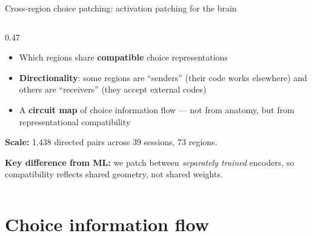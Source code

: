 \documentclass[aspectratio=169,11pt]{beamer}
\begin{document}
\begin{frame}{Cross-region choice patching: activation patching for the brain}
\begin{columns}[T]
\begin{column}{0.47\textwidth}
\vspace{0.5em}
{\small
\begin{itemize}\setlength\itemsep{0.5em}
  \item Which regions share \textbf{compatible} choice representations
  \item \textbf{Directionality}: some regions are ``senders'' (their code works elsewhere) and others are ``receivers'' (they accept external codes)
  \item A \textbf{circuit map} of choice information flow --- not from anatomy, but from representational compatibility
\end{itemize}
}

\vspace{0.5em}
{\small \textbf{Scale:} 1,438 directed pairs across 39 sessions, 73 regions.}

\vspace{0.3em}
{\small \textbf{Key difference from ML:} we patch between \emph{separately trained} encoders, so compatibility reflects shared geometry, not shared weights.}
\end{column}
\end{columns}
\end{frame}

\section{Choice information flow}
\end{document}
